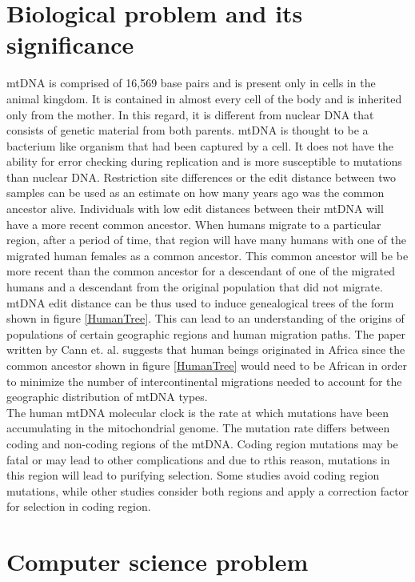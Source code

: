 \documentclass[conference]{IEEEtran}
\begin{document}
\section{Biological problem and its significance}
mtDNA is comprised of 16,569 base pairs and is present only in cells in the animal kingdom. It is contained in almost every cell of the body and is inherited only from the mother. In this regard, it is different from nuclear DNA that consists of genetic material from both parents. mtDNA is thought to be a bacterium like organism that had been captured by a cell. It does not have the ability for error checking during replication and is more susceptible to mutations than nuclear DNA. Restriction site differences or the edit distance between two samples can be used as an estimate on how many years ago was the common ancestor alive. Individuals with low edit distances between their mtDNA will have a more recent common ancestor. When humans migrate to a particular region, after a period of time, that region will have many humans with one of the migrated human females as a common ancestor. This common ancestor will be be more recent than the common ancestor for a descendant of one of the migrated humans and a descendant from the original population that did not migrate. mtDNA edit distance can be thus used to induce genealogical trees of the form shown in figure \ref{HumanTree}. This can lead to an understanding of the origins of populations of certain geographic regions and human migration paths. The paper written by Cann et. al. suggests that human beings originated in Africa since the common ancestor shown in figure \ref{HumanTree} would need to be African in order to minimize the number of intercontinental migrations needed to account for the geographic distribution of mtDNA types.\\

The human mtDNA molecular clock is the rate at which mutations have been accumulating in the mitochondrial genome. The mutation rate differs between coding and non-coding regions of the mtDNA. Coding region mutations may be fatal or may lead to other complications and due to rthis reason, mutations in this region will lead to purifying selection. Some studies avoid coding region mutations, while other studies consider both regions 
 and apply a correction factor for selection in coding region. 

\FloatBarrier
\section{Computer science problem}
\end{document}
